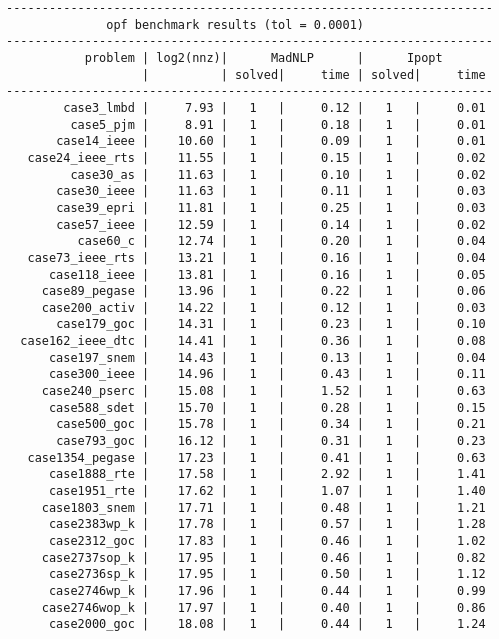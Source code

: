 \begin{verbatim}
--------------------------------------------------------------------
              opf benchmark results (tol = 0.0001)
--------------------------------------------------------------------
           problem | log2(nnz)|      MadNLP      |      Ipopt        
                   |          | solved|     time | solved|     time     
--------------------------------------------------------------------
        case3_lmbd |     7.93 |   1   |     0.12 |   1   |     0.01
         case5_pjm |     8.91 |   1   |     0.18 |   1   |     0.01
       case14_ieee |    10.60 |   1   |     0.09 |   1   |     0.01
   case24_ieee_rts |    11.55 |   1   |     0.15 |   1   |     0.02
         case30_as |    11.63 |   1   |     0.10 |   1   |     0.02
       case30_ieee |    11.63 |   1   |     0.11 |   1   |     0.03
       case39_epri |    11.81 |   1   |     0.25 |   1   |     0.03
       case57_ieee |    12.59 |   1   |     0.14 |   1   |     0.02
          case60_c |    12.74 |   1   |     0.20 |   1   |     0.04
   case73_ieee_rts |    13.21 |   1   |     0.16 |   1   |     0.04
      case118_ieee |    13.81 |   1   |     0.16 |   1   |     0.05
     case89_pegase |    13.96 |   1   |     0.22 |   1   |     0.06
     case200_activ |    14.22 |   1   |     0.12 |   1   |     0.03
       case179_goc |    14.31 |   1   |     0.23 |   1   |     0.10
  case162_ieee_dtc |    14.41 |   1   |     0.36 |   1   |     0.08
      case197_snem |    14.43 |   1   |     0.13 |   1   |     0.04
      case300_ieee |    14.96 |   1   |     0.43 |   1   |     0.11
     case240_pserc |    15.08 |   1   |     1.52 |   1   |     0.63
      case588_sdet |    15.70 |   1   |     0.28 |   1   |     0.15
       case500_goc |    15.78 |   1   |     0.34 |   1   |     0.21
       case793_goc |    16.12 |   1   |     0.31 |   1   |     0.23
   case1354_pegase |    17.23 |   1   |     0.41 |   1   |     0.63
      case1888_rte |    17.58 |   1   |     2.92 |   1   |     1.41
      case1951_rte |    17.62 |   1   |     1.07 |   1   |     1.40
     case1803_snem |    17.71 |   1   |     0.48 |   1   |     1.21
      case2383wp_k |    17.78 |   1   |     0.57 |   1   |     1.28
      case2312_goc |    17.83 |   1   |     0.46 |   1   |     1.02
     case2737sop_k |    17.95 |   1   |     0.46 |   1   |     0.82
      case2736sp_k |    17.95 |   1   |     0.50 |   1   |     1.12
      case2746wp_k |    17.96 |   1   |     0.44 |   1   |     0.99
     case2746wop_k |    17.97 |   1   |     0.40 |   1   |     0.86
      case2000_goc |    18.08 |   1   |     0.44 |   1   |     1.24

\end{verbatim}
